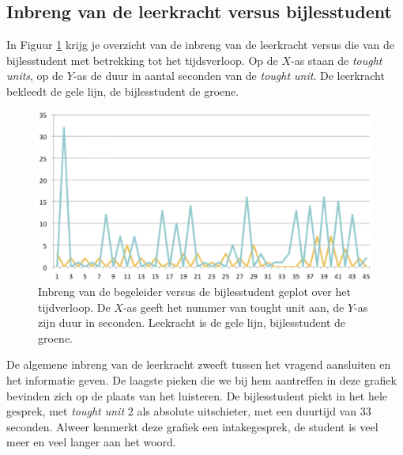 \documentclass[a4paper,12pt]{article}
\theoremstyle{definition}
\begin{document}
\subsection{Inbreng van de leerkracht versus bijlesstudent}
In Figuur \ref{9} krijg je overzicht van de inbreng van de leerkracht versus die van de bijlesstudent met 
betrekking tot het tijdsverloop. Op de $X$-as staan de \emph{tought units}, op 
de $Y$-as de duur in aantal seconden van de \emph{tought unit}. De leerkracht 
bekleedt de gele lijn, de bijlesstudent de groene.
\begin{figure}[h]
  \centering
  \includegraphics[scale=0.5]{grafiek9.png}\caption{Inbreng van de begeleider versus de bijlesstudent geplot over het tijdverloop. De $X$-as geeft het nummer van tought unit aan, de $Y$-as zijn duur in seconden. Leekracht is de gele lijn, bijlesstudent de groene.}\label{9}
\end{figure}

De algemene inbreng van de leerkracht zweeft tussen het vragend aansluiten en het informatie geven. 
De laagste pieken die we bij hem aantreffen in deze grafiek bevinden zich op de plaats van het luisteren. 
De bijlesstudent piekt in het hele gesprek, met \emph{tought unit} 2 als 
absolute uitschieter, met een duurtijd van 33 seconden. Alweer kenmerkt deze 
grafiek een intakegesprek, de student is veel meer en veel langer aan het woord.
\newpage
\end{document}
